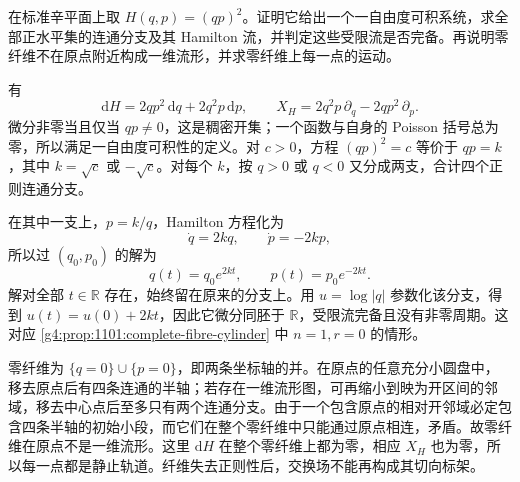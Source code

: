 \begin{exercise}\label{g4:ex:11:singular-cross-fibre}
	在标准辛平面上取 \(H(q,p)=(qp)^2\)。证明它给出一个一自由度可积系统，求全部正水平集的连通分支及其 Hamilton 流，并判定这些受限流是否完备。再说明零纤维不在原点附近构成一维流形，并求零纤维上每一点的运动。
\end{exercise}
\begin{solution}
	有
	\[
		\mathrm{d}H=2qp^2\,\mathrm{d}q+2q^2p\,\mathrm{d}p,
		\qquad
		X_H=2q^2p\,\partial_q-2qp^2\,\partial_p.
	\]
	微分非零当且仅当 \(qp\neq0\)，这是稠密开集；一个函数与自身的 Poisson 括号总为零，所以满足一自由度可积性的定义。对 \(c>0\)，方程 \((qp)^2=c\) 等价于 \(qp=k\)，其中 \(k=\sqrt c\) 或 \(-\sqrt c\)。对每个 \(k\)，按 \(q>0\) 或 \(q<0\) 又分成两支，合计四个正则连通分支。

	在其中一支上，\(p=k/q\)，Hamilton 方程化为
	\[
		\dot q=2kq,\qquad \dot p=-2kp,
	\]
	所以过 \((q_0,p_0)\) 的解为
	\[
		q(t)=q_0e^{2kt},\qquad p(t)=p_0e^{-2kt}.
	\]
	解对全部 \(t\in\mathbb R\) 存在，始终留在原来的分支上。用 \(u=\log|q|\) 参数化该分支，得到 \(u(t)=u(0)+2kt\)，因此它微分同胚于 \(\mathbb R\)，受限流完备且没有非零周期。这对应 \cref{g4:prop:1101:complete-fibre-cylinder} 中 \(n=1,r=0\) 的情形。

	零纤维为 \(\{q=0\}\cup\{p=0\}\)，即两条坐标轴的并。在原点的任意充分小圆盘中，移去原点后有四条连通的半轴；若存在一维流形图，可再缩小到映为开区间的邻域，移去中心点后至多只有两个连通分支。由于一个包含原点的相对开邻域必定包含四条半轴的初始小段，而它们在整个零纤维中只能通过原点相连，矛盾。故零纤维在原点不是一维流形。这里 \(\mathrm{d}H\) 在整个零纤维上都为零，相应 \(X_H\) 也为零，所以每一点都是静止轨道。纤维失去正则性后，交换场不能再构成其切向标架。
\end{solution}

